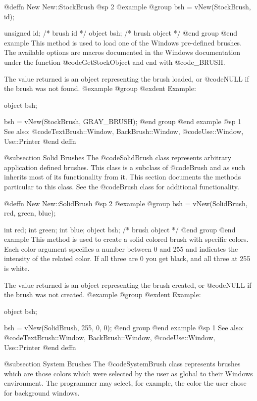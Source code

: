 @deffn {New} New::StockBrush
@sp 2
@example
@group
bsh = vNew(StockBrush, id);

unsigned id;    /*  brush id      */
object  bsh;    /*  brush object  */
@end group
@end example
This method is used to load one of the Windows pre-defined brushes.
The available options are macros documented in the Windows documentation
under the function @code{GetStockObject} and end with @code{_BRUSH}.

The value returned is an object representing the brush loaded, or
@code{NULL} if the brush was not found.
@example
@group
@exdent Example:

object  bsh;

bsh = vNew(StockBrush, GRAY_BRUSH);
@end group
@end example
@sp 1
See also:  @code{TextBrush::Window, BackBrush::Window,}
        @code{Use::Window, Use::Printer}
@end deffn









@subsection Solid Brushes
The @code{SolidBrush} class represents arbitrary application defined
brushes.  This class is a subclass of @code{Brush} and as such inherits
most of its functionality from it.  This section documents the methods
particular to this class.  See the @code{Brush} class for additional
functionality.






@deffn {New} New::SolidBrush
@sp 2
@example
@group
bsh = vNew(SolidBrush, red, green, blue);

int     red;
int     green;
int     blue;
object  bsh;    /*  brush object  */
@end group
@end example
This method is used to create a solid colored brush with specific colors.
Each color argument specifies a number between 0 and 255 and indicates
the intensity of the related color.  If all three are 0 you get black,
and all three at 255 is white.

The value returned is an object representing the brush created, or
@code{NULL} if the brush was not created.
@example
@group
@exdent Example:

object  bsh;

bsh = vNew(SolidBrush, 255, 0, 0);
@end group
@end example
@sp 1
See also:  @code{TextBrush::Window, BackBrush::Window,}
        @code{Use::Window, Use::Printer}
@end deffn




@subsection System Brushes
The @code{SystemBrush} class represents brushes which are those colors
which were selected by the user as global to their Windows environment.
The programmer may select, for example, the color the user chose for
background windows.

